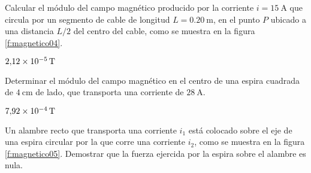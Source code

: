 %
\begin{Exercise}\label{p:magnetico04}
    Calcular el módulo del campo magnético producido por la corriente $i = \SI{15}{\ampere}$ que circula por un segmento de cable de longitud $L = \SI{0.20}{\metre}$, en el punto $P$ ubicado a una distancia $L/2$ del centro del cable, como se muestra en la figura \ref{f:magnetico04}.
\end{Exercise}
\begin{Answer}
    $\SI{2.12E-5}{\tesla}$
\end{Answer}
%
\begin{center}
\end{center}
%
\begin{Exercise}
    Determinar el módulo del campo magnético en el centro de una espira cuadrada de $\SI{4}{\centi\metre}$ de lado, que transporta una corriente de $\SI{28}{\ampere}$.
\end{Exercise}
\begin{Answer}
    $\SI{7.92E-4}{\tesla}$
\end{Answer}
%
\begin{Exercise}\label{p:magnetico05}
    Un alambre recto que transporta una corriente $i_1$ está colocado sobre el eje de una espira circular por la que corre una corriente $i_2$, como se muestra en la figura \ref{f:magnetico05}. Demostrar que la fuerza ejercida por la espira sobre el alambre es nula.
\end{Exercise}
%

